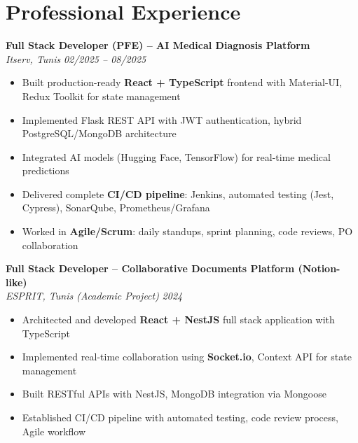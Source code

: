 \documentclass[10pt,a4paper]{article}
\begin{document}
\vspace{5pt}

\section*{Professional Experience}
\vspace{2pt}

{\small

\textbf{Full Stack Developer (PFE) -- AI Medical Diagnosis Platform}\\[1pt]
\textit{Itserv, Tunis} \hfill \textit{02/2025 -- 08/2025}
\begin{itemize}[leftmargin=12pt,itemsep=2pt,topsep=3pt,parsep=0pt]
  \item Built production-ready \textbf{React + TypeScript} frontend with Material-UI, Redux Toolkit for state management
  \item Implemented Flask REST API with JWT authentication, hybrid PostgreSQL/MongoDB architecture
  \item Integrated AI models (Hugging Face, TensorFlow) for real-time medical predictions
  \item Delivered complete \textbf{CI/CD pipeline}: Jenkins, automated testing (Jest, Cypress), SonarQube, Prometheus/Grafana
  \item Worked in \textbf{Agile/Scrum}: daily standups, sprint planning, code reviews, PO collaboration
\end{itemize}

\vspace{3pt}
\textbf{Full Stack Developer -- Collaborative Documents Platform (Notion-like)}\\[1pt]
\textit{ESPRIT, Tunis (Academic Project)} \hfill \textit{2024}
\begin{itemize}[leftmargin=12pt,itemsep=2pt,topsep=3pt,parsep=0pt]
  \item Architected and developed \textbf{React + NestJS} full stack application with TypeScript
  \item Implemented real-time collaboration using \textbf{Socket.io}, Context API for state management
  \item Built RESTful APIs with NestJS, MongoDB integration via Mongoose
  \item Established CI/CD pipeline with automated testing, code review process, Agile workflow
\end{itemize}

}
\end{document}
